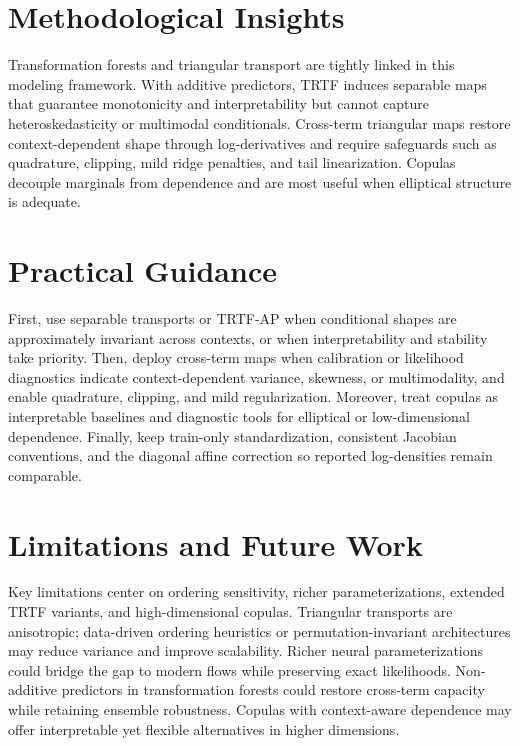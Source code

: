 \documentclass[11pt,a4paper,twoside]{book}\usepackage[]{graphicx}\usepackage[]{xcolor}
\begin{document}
\section{Methodological Insights}

Transformation forests and triangular transport are tightly linked in this modeling framework. With additive predictors, TRTF induces separable maps that guarantee monotonicity and interpretability but cannot capture heteroskedasticity or multimodal conditionals. Cross-term triangular maps restore context-dependent shape through log-derivatives and require safeguards such as quadrature, clipping, mild ridge penalties, and tail linearization. Copulas decouple marginals from dependence and are most useful when elliptical structure is adequate.

\section{Practical Guidance}

First, use separable transports or TRTF-AP when conditional shapes are approximately invariant across contexts, or when interpretability and stability take priority. Then, deploy cross-term maps when calibration or likelihood diagnostics indicate context-dependent variance, skewness, or multimodality, and enable quadrature, clipping, and mild regularization. Moreover, treat copulas as interpretable baselines and diagnostic tools for elliptical or low-dimensional dependence. Finally, keep train-only standardization, consistent Jacobian conventions, and the diagonal affine correction so reported log-densities remain comparable.

\section{Limitations and Future Work}

Key limitations center on ordering sensitivity, richer parameterizations, extended TRTF variants, and high-dimensional copulas. Triangular transports are anisotropic; data-driven ordering heuristics or permutation-invariant architectures may reduce variance and improve scalability. Richer neural parameterizations could bridge the gap to modern flows while preserving exact likelihoods. Non-additive predictors in transformation forests could restore cross-term capacity while retaining ensemble robustness. Copulas with context-aware dependence may offer interpretable yet flexible alternatives in higher dimensions.
\end{document}
